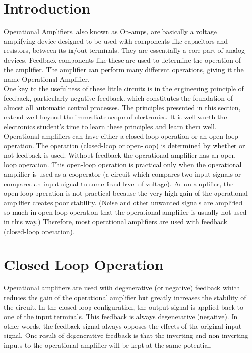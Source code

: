 \section{Introduction}
Operational Amplifiers, also known as Op-amps, are basically a voltage amplifying device designed to be used with components like capacitors and resistors, between its in/out terminals. They are essentially a core part of analog devices. Feedback components like these are used to determine the operation of the amplifier. The amplifier can perform many different operations, giving it the name Operational Amplifier.\\

One key to the usefulness of these little circuits is in the engineering principle of feedback, particularly negative feedback, which constitutes the foundation of almost all automatic control processes. The principles presented in this section, extend well beyond the immediate scope of electronics. It is well worth the electronics student’s time to learn these principles and learn them well.\\

Operational amplifiers can have either a closed-loop operation or an open-loop operation. The operation (closed-loop or open-loop) is determined by whether or not feedback is used. Without feedback the operational amplifier has an open-loop operation. This open-loop operation is practical only when the operational amplifier is used as a cooperator (a circuit which compares two input signals or compares an input signal to some fixed level of voltage). As an amplifier, the open-loop operation is not practical because the very high gain of the operational amplifier creates poor stability. (Noise and other unwanted signals are amplified so much in open-loop operation that the operational amplifier is usually not used in this way.) Therefore, most operational amplifiers are used with feedback (closed-loop operation).

\newpage
\section{Closed Loop Operation}

Operational amplifiers are used with degenerative (or negative) feedback which reduces the gain of the operational amplifier but greatly increases the stability of the circuit. In the closed-loop configuration, the output signal is applied back to one of the input terminals. This feedback is always degenerative (negative). In other words, the feedback signal always opposes the effects of the original input signal. One result of degenerative feedback is that the inverting and non-inverting inputs to the operational amplifier will be kept at the same potential.\\

